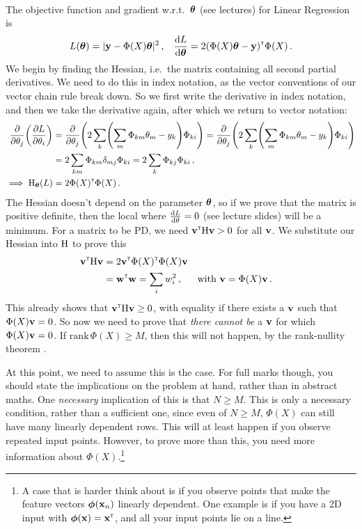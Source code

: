 \paragraph{}
The objective function and gradient w.r.t.~$\vtheta$ (see lectures) for Linear Regression is
\begin{align}
L(\vtheta) = \norm{\vy - \Phi(X)\vtheta}^2 \,, &&
\deriv[L]{\vtheta} = 2(\Phi(X)\vtheta - \vy)\transpose\Phi(X) \,.
\end{align}
We begin by finding the Hessian, i.e.~the matrix containing all second partial derivatives. We need to do this in index notation, as the vector conventions of our vector chain rule break down. So we first write the derivative in index notation, and then we take the derivative again, after which we return to vector notation:
\begin{align}
\pderiv[]{\theta_j} \left(\pderiv[L]{\theta_i}\right) &=
\pderiv[]{\theta_j} \left(2\sum_k\left(\sum_m\Phi_{km}\theta_m - y_k\right)\Phi_{ki}\right) =
\pderiv[]{\theta_j} \left(2\sum_k\left(\sum_m\Phi_{km}\theta_m - y_k\right)\Phi_{ki}\right) \\
&= 2\sum_{km}\Phi_{km}\delta_{mj}\Phi_{ki} = 2\sum_{k}\Phi_{kj}\Phi_{ki} \,, \\
\implies \mat H_{\vtheta}(L) &= 2 \Phi(X)\transpose\Phi(X) \,.
\end{align}
The Hessian doesn't depend on the parameter $\vtheta$, so if we prove that the matrix is positive definite, then the local where $\deriv[L]{\theta} = 0$ (see lecture slides) will be a minimum. For a matrix to be PD, we need $\vv\transpose\mat H\vv > 0$ for all $\vv$. We substitute our Hessian into $\mat H$ to prove this
\begin{align}
\vv\transpose \mat H \vv &= 2\vv\transpose \Phi(X)\transpose\Phi(X) \vv \\
&= \vw\transpose\vw = \sum_i w_i^2\,, && \text{with } \vv = \Phi(X)\vv\,.
\end{align}
This already shows that $\vv\transpose \mat H \vv \geq 0$, with equality if there exists a $\vv$ such that $\Phi(X)\vv = 0$. So now we need to prove that \emph{there cannot be} a $\vv$ for which $\Phi(X)\vv = 0$. If $\mathrm{rank}\,\Phi(X) \geq M$, then this will not happen, by the rank-nullity theorem \citep[\S 2.7.3]{mml}.

At this point, we need to assume this is the case. For full marks though, you should state the implications on the problem at hand, rather than in abstract maths. One \emph{necessary} implication of this is that $N\geq M$. This is only a necessary condition, rather than a sufficient one, since even of $N \geq M$, $\Phi(X)$ can still have many linearly dependent rows. This will at least happen if you observe repeated input points. However, to prove more than this, you need more information about $\Phi(X)$.\footnote{A case that is harder think about is if you observe points that make the feature vectors $\vphi(\vx_n)$ linearly dependent. One example is if you have a 2D input with $\vphi(\vx) = \vx\transpose$, and all your input points lie on a line.}

